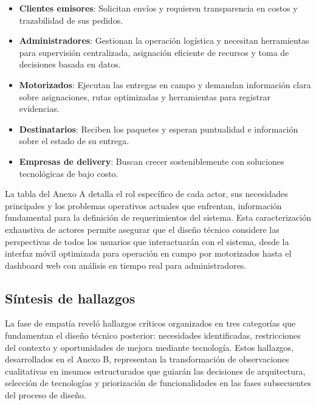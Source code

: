 \begin{itemize}
    \item \textbf{Clientes emisores}: Solicitan envíos y requieren transparencia en costos y trazabilidad de sus pedidos.
    
    \item \textbf{Administradores}: Gestionan la operación logística y necesitan herramientas para supervisión centralizada, asignación eficiente de recursos y toma de decisiones basada en datos.
    
    \item \textbf{Motorizados}: Ejecutan las entregas en campo y demandan información clara sobre asignaciones, rutas optimizadas y herramientas para registrar evidencias.
    
    \item \textbf{Destinatarios}: Reciben los paquetes y esperan puntualidad e información sobre el estado de su entrega.
    
    \item \textbf{Empresas de delivery}: Buscan crecer sosteniblemente con soluciones tecnológicas de bajo costo.
\end{itemize}

La tabla del Anexo A detalla el rol específico de cada actor, sus necesidades principales y los problemas operativos actuales que enfrentan, información fundamental para la definición de requerimientos del sistema. Esta caracterización exhaustiva de actores permite asegurar que el diseño técnico considere las perspectivas de todos los usuarios que interactuarán con el sistema, desde la interfaz móvil optimizada para operación en campo por motorizados hasta el dashboard web con análisis en tiempo real para administradores.

\subsection{Síntesis de hallazgos}

La fase de empatía reveló hallazgos críticos organizados en tres categorías que fundamentan el diseño técnico posterior: necesidades identificadas, restricciones del contexto y oportunidades de mejora mediante tecnología. Estos hallazgos, desarrollados en el Anexo B, representan la transformación de observaciones cualitativas en insumos estructurados que guiarán las decisiones de arquitectura, selección de tecnologías y priorización de funcionalidades en las fases subsecuentes del proceso de diseño.

